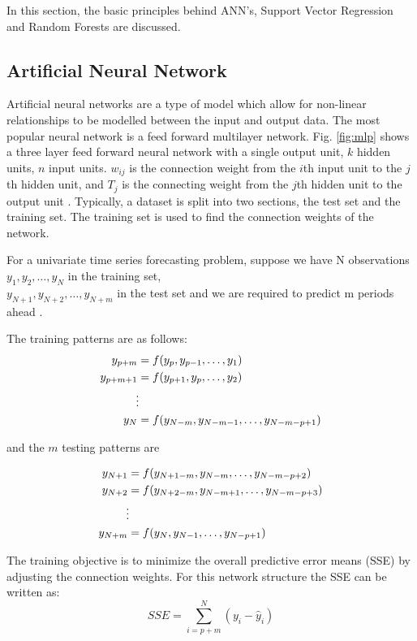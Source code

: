 In this section, the basic principles behind ANN's, Support Vector Regression and Random Forests are discussed.

\subsection{Artificial Neural Network}

Artificial neural networks are a type of model which allow for non-linear relationships to be modelled between the input and output data. The most popular neural network is a feed forward multilayer network. Fig. \ref{fig:mlp} shows a three layer feed forward neural network with a single output unit, $k$ hidden units, $n$ input units. $w_{ij}$ is the connection weight from the $i$th input unit to the $j$th hidden unit,  and $T_j$ is the connecting weight from the $j$th hidden unit to the output unit \cite{Pao2007}. Typically, a dataset is split into two sections, the test set and the training set. The training set is used to find the connection weights of the network. 

For a univariate time series forecasting problem, suppose we have N observations $y_1, y_2, \ldots, y_N$ in the training set, \\ $y_{N+1}, y_{N+2}, \ldots, y_{N+m}$ in the test set and we are required to predict m periods ahead \cite{Pao2007}. 

The training patterns are as follows:
\begin{align}
y_{p+m} & =f(y_p, y_{p-1},\ldots,y_1)\\
y_{p+m+1} & =f(y_{p+1}, y_{p},\ldots,y_2)\\
&\vdotswithin  \notag \\
y_{N} & =f(y_{N-m},y_{N-m-1},\ldots,y_{N-m-p+1})
\end{align}

and the $m$ testing patterns are 

\begin{align}
y_{N+1} & =f(y_{N+1-m}, y_{N-m},\ldots,y_{N-m-p+2})\\
y_{N+2} & =f(y_{N+2-m}, y_{N-m+1},\ldots,y_{N-m-p+3})\\
&\vdotswithin  \notag \\
y_{N+m} & =f(y_{N},y_{N-1},\ldots,y_{N-p+1})
\end{align}

The training objective is to minimize the overall predictive error means (SSE) by adjusting the connection weights. For this network structure the SSE can be written as:
\begin{equation}
SSE = \sum_{i=p+m}^N(y_i-\hat{y}_i)
\end{equation}

